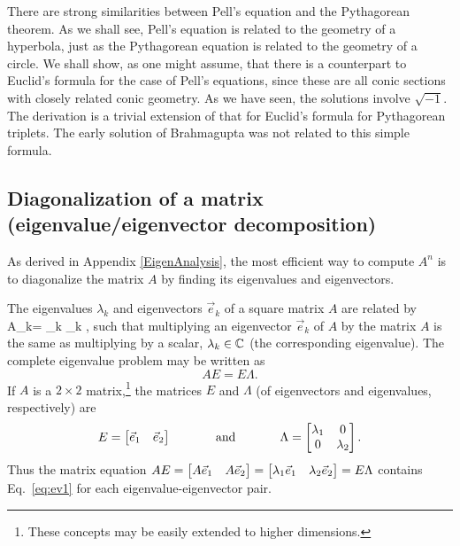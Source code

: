 \documentclass{ximera}
\begin{document}
There are strong similarities between Pell's equation and the Pythagorean theorem. 
As we shall see,
Pell's equation is related to the geometry of a hyperbola, just as the Pythagorean equation is
related to the geometry of a circle.
We shall show, as one might assume, that there is a counterpart to Euclid's formula for the case of Pell's equations,
since these are all conic sections with closely related conic geometry. As we have seen, the solutions
involve $\sqrt{-1}$.  The derivation is a trivial extension of that for Euclid's formula for
Pythagorean triplets.  The early solution of Brahmagupta was not related to this simple formula.





\subsection{Diagonalization of a matrix (eigenvalue/eigenvector decomposition)}
As derived in Appendix \ref{EigenAnalysis}, the most efficient way to compute $A^n$ is to
diagonalize the matrix $A$ by finding its eigenvalues and eigenvectors.

The eigenvalues $\lambda_k$ and eigenvectors $\vec{e}_k$ of a square matrix $A$ are related by
\be
A_k= \lambda_k _k , \label{eq:ev1}
\ee
such that multiplying an eigenvector $\vec{e}_k$ of $A$ by the matrix $A$ is the same as multiplying by a scalar, $\lambda_k \in \mathbb{C}$ (the corresponding eigenvalue). %
The complete eigenvalue problem may be written as
 \[
AE=E\Lambda.
 \]
 If $A$ is a $2\times2$ matrix,\footnote{These concepts may be easily extended to higher dimensions.} the matrices $E$ and $\Lambda$ (of eigenvectors and eigenvalues, respectively) are%
\[ E =  
\begin{bmatrix}
\vec{e}_1& \vec{e}_2
\end{bmatrix}
\hspace{.5in}
\text{and}
\hspace{.5in}
\Lambda =
\begin{bmatrix}
\lambda_1 & 0 \\
0 & \lambda_2  
\end{bmatrix}.
\]
Thus the matrix equation
$AE=
\begin{bmatrix}
A\vec{e}_1 & A\vec{e}_2
\end{bmatrix}
= \begin{bmatrix}
\lambda_1\vec{e}_1 & \lambda_2\vec{e}_2
\end{bmatrix}
= E\Lambda$
contains Eq.~\ref{eq:ev1} for each eigenvalue-eigenvector pair.
\end{document}
